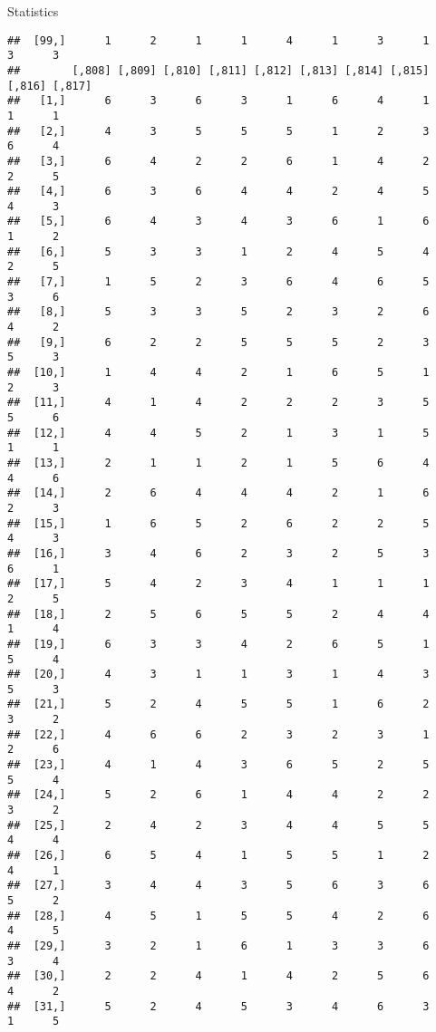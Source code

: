 \documentclass[
  ignorenonframetext,
]{beamer}
\begin{document}
\begin{frame}[fragile]{Statistics}
\begin{verbatim}
##  [99,]      1      2      1      1      4      1      3      1      3      3
##        [,808] [,809] [,810] [,811] [,812] [,813] [,814] [,815] [,816] [,817]
##   [1,]      6      3      6      3      1      6      4      1      1      1
##   [2,]      4      3      5      5      5      1      2      3      6      4
##   [3,]      6      4      2      2      6      1      4      2      2      5
##   [4,]      6      3      6      4      4      2      4      5      4      3
##   [5,]      6      4      3      4      3      6      1      6      1      2
##   [6,]      5      3      3      1      2      4      5      4      2      5
##   [7,]      1      5      2      3      6      4      6      5      3      6
##   [8,]      5      3      3      5      2      3      2      6      4      2
##   [9,]      6      2      2      5      5      5      2      3      5      3
##  [10,]      1      4      4      2      1      6      5      1      2      3
##  [11,]      4      1      4      2      2      2      3      5      5      6
##  [12,]      4      4      5      2      1      3      1      5      1      1
##  [13,]      2      1      1      2      1      5      6      4      4      6
##  [14,]      2      6      4      4      4      2      1      6      2      3
##  [15,]      1      6      5      2      6      2      2      5      4      3
##  [16,]      3      4      6      2      3      2      5      3      6      1
##  [17,]      5      4      2      3      4      1      1      1      2      5
##  [18,]      2      5      6      5      5      2      4      4      1      4
##  [19,]      6      3      3      4      2      6      5      1      5      4
##  [20,]      4      3      1      1      3      1      4      3      5      3
##  [21,]      5      2      4      5      5      1      6      2      3      2
##  [22,]      4      6      6      2      3      2      3      1      2      6
##  [23,]      4      1      4      3      6      5      2      5      5      4
##  [24,]      5      2      6      1      4      4      2      2      3      2
##  [25,]      2      4      2      3      4      4      5      5      4      4
##  [26,]      6      5      4      1      5      5      1      2      4      1
##  [27,]      3      4      4      3      5      6      3      6      5      2
##  [28,]      4      5      1      5      5      4      2      6      4      5
##  [29,]      3      2      1      6      1      3      3      6      3      4
##  [30,]      2      2      4      1      4      2      5      6      4      2
##  [31,]      5      2      4      5      3      4      6      3      1      5

\end{verbatim}
\end{frame}
\end{document}
